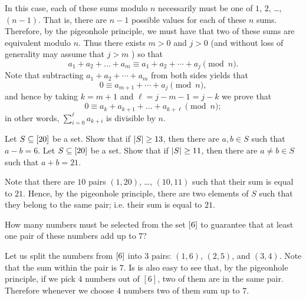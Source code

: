 \begin{chapterendexercises}
\begin{solution}
      In this case, each of these sums modulo $n$ necessarily must be one of
      $1$, $2$, \dots, $(n - 1)$. That is, there are $n - 1$ possible values for
      each of these $n$ sums. Therefore, by the pigeonhole principle, we must
      have that two of these sums are equivalent modulo $n$. Thus there exists
      $m > 0 $ and $j > 0$ (and without loss of generality may assume that $j >
      m$ ) so that 
      \[
        a_1 + a_2 + \dots + a_m \equiv a_1 + a_2 + \cdots + a_j \pmod{n}.
      \]
      Note that subtracting $ a_1 + a_2 + \cdots + a_m$ from both sides yields
      that 
      \[
        0 \equiv
        a_{m + 1} + \cdots + a_{j} \pmod{n},
      \]
      and hence by taking $k = m + 1$ and $\ell = j - m - 1 = j - k $ we prove that 
      \[
        0 \equiv a_k + a_{k + 1} + \dots + a_{k + \ell} \pmod{n};
      \] 
      in other words, $\sum\limits_{i = 0}^\ell a_{k + i}$ is divisible by $n$.
    \end{solution}
  \exercise[recommended] Let $S \subseteq {[{20}]}$ be a set. Show that if
    $\left|{S}\right| \ge 13$, then there are $a, b \in S$ such that $a - b = 6$.
  \exercise Let $S \subseteq {[{20}]}$ be a set. Show that if $\left|{S}\right|
    \ge 11$, then there are $a \neq b \in S$ such that $a + b = 21$.
    \begin{solution}
      Note that there are $10$ pairs $(1, 20)$, \dots, $(10, 11)$ such that their
      sum is equal to $21$. Hence, by the pigeonhole principle, there are two
      elements of $S$ such that they belong to the same pair; i.e. their sum is
      equal to $21$.
    \end{solution}
  \exercise How many numbers must be selected from the set ${[{6}]}$ to
    guarantee that at least one pair of these numbers add up to $7$?
    \begin{solution}
      Let us split the numbers from ${[{6}]}$ into $3$ pairs:
      $(1, 6)$, $(2, 5)$, and $(3, 4)$. Note that the sum within the pair is
      $7$. Is is also easy to see that, by the pigeonhole principle, if we pick
      $4$ numbers out of $[6]$, two of them are in the same pair. Therefore
      whenever we choose $4$ numbers two of them sum up to $7$.


\end{solution}
\end{chapterendexercises}
